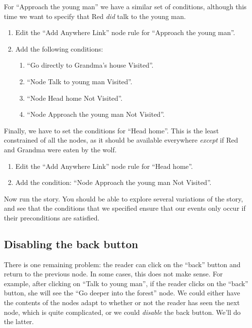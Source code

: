 \documentclass{article}
\begin{document}
For ``Approach the young man'' we have a similar set of conditions, although this time we want to specify that Red \textit{did} talk to the young man.

\begin{enumerate}
  \item Edit the ``Add Anywhere Link'' node rule for ``Approach the young man''.
  \item Add the following conditions:
  \begin{enumerate}
  \item ``Go directly to Grandma's house Visited''.
  \item ``Node Talk to young man Visited''.
  \item ``Node Head home Not Visited''.
  \item ``Node Approach the young man Not Visited''.
\end{enumerate}
\end{enumerate}

Finally, we have to set the conditions for ``Head home''. This is the least constrained of all the nodes, as it should be available everywhere
\textit{except} if Red and Grandma were eaten by the wolf.

\begin{enumerate}
  \item Edit the ``Add Anywhere Link'' node rule for ``Head home''.
  \item Add the condition: ``Node Approach the young man Not Visited''.
\end{enumerate}

Now run the story. You should be able to explore several variations of the story, and see that the conditions that we specified ensure that our events only occur if their preconditions are satisfied.

\subsection{Disabling the back button}

There is one remaining problem: the reader can click on the ``back'' button and return to the previous node. In some cases, this does not make sense. For example, after clicking on ``Talk to young man'', if the reader clicks on the ``back'' button, she will see the ``Go deeper into the forest'' node. We could either have the contents of the nodes adapt to whether or not the reader has seen the next node, which is quite complicated, or we could \textit{disable} the back button. We'll do the latter.
\end{document}
